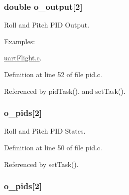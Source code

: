 \hypertarget{group__pid_gaf457b38bb75f72a89bac9b4a9570bd99}{
\subsubsection[{o\-\_\-output}]{\setlength{\rightskip}{0pt plus 5cm}double o\-\_\-output\mbox{[}2\mbox{]}}}\label{group__pid_gaf457b38bb75f72a89bac9b4a9570bd99}


Roll and Pitch P\-I\-D Output. 

\begin{Desc}
\item[Examples\-: ]\par
\hyperlink{uart_flight_8c-example}{uart\-Flight.\-c}.\end{Desc}


Definition at line 52 of file pid.\-c.



Referenced by pid\-Task(), and set\-Task().

\hypertarget{group__pid_gaf8f428e17178b1f15edba7158fd831da}{
\subsubsection[{o\-\_\-pids}]{ o\-\_\-pids\mbox{[}2\mbox{]}}}\label{group__pid_gaf8f428e17178b1f15edba7158fd831da}


Roll and Pitch P\-I\-D States. 



Definition at line 50 of file pid.\-c.



Referenced by set\-Task().

\hypertarget{group__pid_gaf8f428e17178b1f15edba7158fd831da}{
\subsubsection[{o\-\_\-pids}]{ o\-\_\-pids\mbox{[}2\mbox{]}}}\label{group__pid_gaf8f428e17178b1f15edba7158fd831da}


